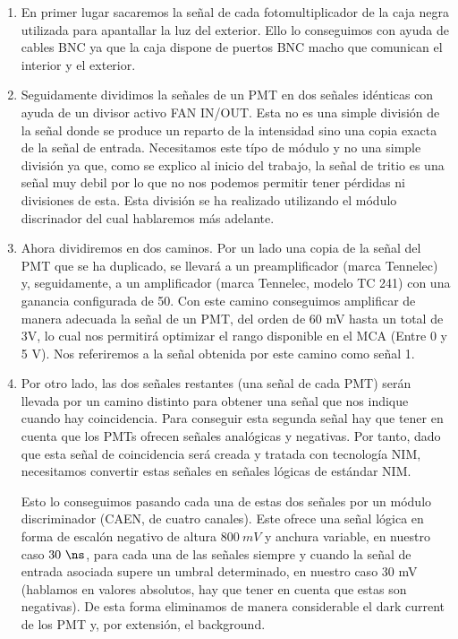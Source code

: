 \begin{enumerate} 
\item{} En primer lugar sacaremos la señal de cada fotomultiplicador de la caja negra utilizada para apantallar la luz del exterior. Ello lo conseguimos con ayuda de cables BNC  ya que la caja dispone de puertos BNC macho que comunican el interior y el exterior.

\item {} Seguidamente dividimos la señales de un PMT en dos señales idénticas con ayuda de un divisor activo FAN IN/OUT. Esta no es una simple división de la señal donde se produce un reparto de la intensidad sino una copia exacta de la señal de entrada. Necesitamos este típo de módulo y no una simple división ya que, como se explico al inicio del trabajo, la señal de tritio es una señal muy debil por lo que no nos podemos permitir tener pérdidas ni divisiones de esta. Esta división se ha realizado utilizando el módulo discrinador del cual hablaremos más adelante.

\item {} Ahora dividiremos en dos caminos. Por un lado una copia de la señal del PMT que se ha duplicado, se llevará a un preamplificador (marca Tennelec) y, seguidamente, a un amplificador (marca Tennelec, modelo TC 241) con una ganancia configurada de 50. Con este camino conseguimos amplificar de manera adecuada la señal de un PMT, del orden de 60 mV hasta un total de 3V, lo cual nos permitirá optimizar el rango disponible en el MCA (Entre 0 y 5 V). Nos referiremos a la señal obtenida por este camino como señal 1.

\item{} Por otro lado, las dos señales restantes (una señal de cada PMT) serán llevada por un camino distinto para obtener una señal que nos indique cuando hay coincidencia. Para conseguir esta segunda señal hay que tener en cuenta que los PMTs ofrecen señales analógicas y negativas. Por tanto, dado que esta señal de coincidencia será creada y tratada con tecnología NIM, necesitamos convertir estas señales en señales lógicas de estándar NIM. 

Esto lo conseguimos pasando cada una de estas dos señales por un módulo discriminador (CAEN, de cuatro canales). Este ofrece una señal lógica en forma de escalón negativo de altura $800~mV$ y anchura variable, en nuestro caso $30~\ns$, para cada una de las señales siempre y cuando la señal de entrada asociada supere un umbral determinado, en nuestro caso 30 mV (hablamos en valores absolutos, hay que tener en cuenta que estas son negativas). De esta forma eliminamos de manera considerable el dark current de los PMT y, por extensión, el background.


\end{enumerate}
